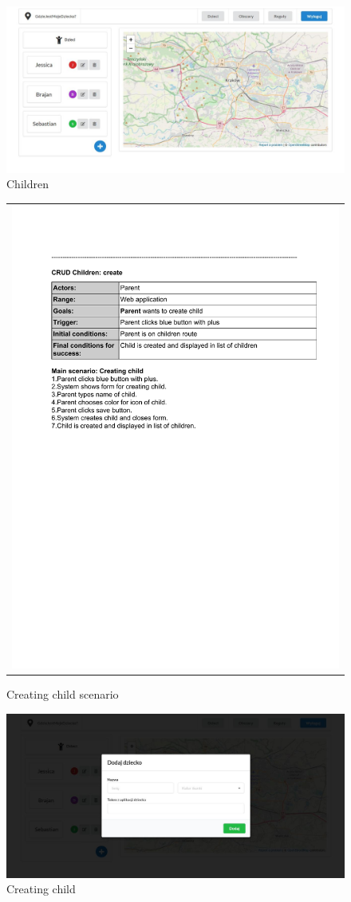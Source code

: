 \documentclass{sprawozdanie-agh}
\begin{document}
		\begin{figure}[H]
			\centering
			\includegraphics[width=.80\textwidth]{children}
			\caption{Children}
		\end{figure}

		\begin{figure}[H] 
			\centering
			\begin{tabular}{c}
				\includegraphics[width=.80\textwidth]{crC_cropped} 
			\end{tabular} 
		\caption{Creating child scenario}
		\end{figure}

		\begin{figure}[H]
			\centering
			\includegraphics[width=.80\textwidth]{addChild}
			\caption{Creating child}
		\end{figure}
\end{document}
